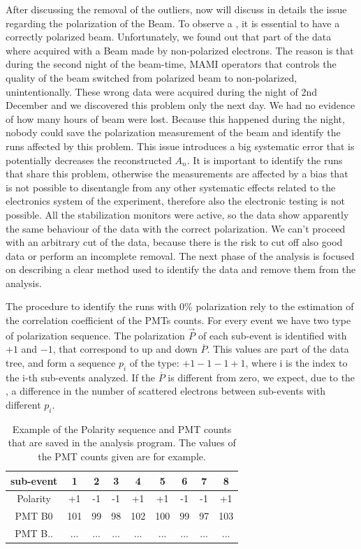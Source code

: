 After discussing the removal of the outliers, now will discuss in details the issue regarding the polarization of the Beam. To observe a \transv, it is essential to have a correctly polarized beam.
Unfortunately, we found out that part of the data where acquired with a Beam made by non-polarized electrons. The reason is that during the second night of the beam-time, MAMI operators that controls the quality of the beam switched from polarized beam to non-polarized, unintentionally. These wrong data were acquired during the night of 2nd December and we discovered this problem only the next day. We had no evidence of how many hours of beam were lost. Because this happened during the night, nobody could save the polarization measurement of the beam and identify the runs affected by this problem.
This issue introduces a big systematic error that is potentially decreases the reconstructed $A_{n}$. It is important to identify the runs that share this problem, otherwise the measurements are affected by a bias that is not possible to disentangle from any other systematic effects related to the electronics system of the experiment, therefore also the electronic testing is not possible. 
All the stabilization monitors were active, so the data show apparently the same behaviour of the data with the correct polarization. We can't proceed with an arbitrary cut of the data, because there is the risk to cut off also good data or perform an incomplete removal. The next phase of the analysis is focused on describing a clear method used to identify the data and remove them from the analysis.
 
The procedure to identify the runs with $0\%$ polarization rely to the estimation of the correlation coefficient of the PMTs counts. For every event we have two type of polarization sequence. The polarization $\vec{P}$ of each sub-event is identified with $+1$ and $-1$, that correspond to up and down $\overline{P}$. This values are part of the data tree, and form a sequence $p_{i}$ of the type: $+1-1-1+1$, where i is the index to the i-th sub-events analyzed. If the $\overline{P}$ is different from zero, we expect, due to the \transv, a difference in the number of scattered electrons between sub-events with different $p_{i}$. \medskip

\begin{table}[ht]
\centering
\begin{tabular}{|c|c|c|c|c|c|c|c|c|}
\hline 
sub-event & 1 & 2 & 3 & 4 & 5 & 6 & 7 & 8 \\ 
\hline 
Polarity & +1 & -1 & -1 & +1 & +1 & -1 & -1 & +1 \\ 
\hline 
PMT B0 & 101 & 99 & 98 & 102 & 100 & 99 & 97 & 103 \\ 
\hline 
PMT B.. & ... & ... & ... & ... & ... & ... & ... & ... \\ 
\hline
\end{tabular}
\caption{Example of the Polarity sequence and PMT counts that are saved in the analysis program. The values of the PMT counts given are for example. }
\end{table}



